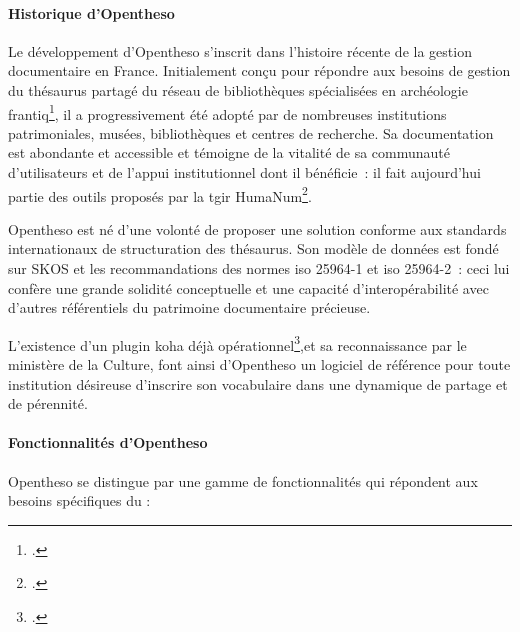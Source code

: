 \paragraph*{Historique d’Opentheso}

Le développement d’Opentheso s’inscrit dans l'histoire récente de la gestion documentaire en France. Initialement conçu pour répondre aux besoins de gestion du thésaurus partagé du réseau de bibliothèques spécialisées en archéologie \ac{frantiq}\footcite{nouvelThesaurusPACTOLSSysteme2019}, il a progressivement été adopté par de nombreuses institutions patrimoniales, musées, bibliothèques et centres de recherche. Sa documentation est abondante et accessible et témoigne de la vitalité de sa communauté d’utilisateurs et de l’appui institutionnel dont il bénéficie~: il fait aujourd'hui partie des outils proposés par la \ac{tgir} HumaNum\footcite{PresentationDOpenTheso}.



Opentheso est né d’une volonté de proposer une solution conforme aux standards internationaux de structuration des thésaurus. Son modèle de données est fondé sur SKOS et les recommandations des normes \gls{iso} 25964-1 et \gls{iso} 25964-2~: ceci lui confère une grande solidité conceptuelle et une capacité d’interopérabilité avec d'autres référentiels du patrimoine documentaire précieuse.



L’existence d’un plugin \gls{koha} déjà opérationnel\footcite{PluginTamilOpentheso},et sa reconnaissance par le ministère de la Culture, font ainsi d’Opentheso un logiciel de référence pour toute institution désireuse d’inscrire son vocabulaire dans une dynamique de partage et de pérennité.



\paragraph*{Fonctionnalités d’Opentheso}



Opentheso se distingue par une gamme de fonctionnalités qui répondent aux besoins spécifiques du \mae:



